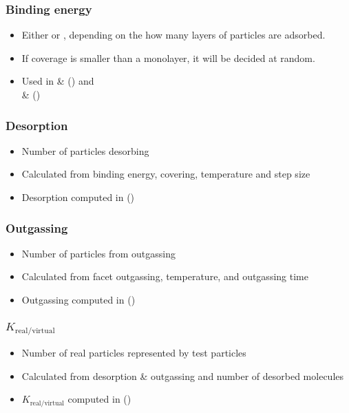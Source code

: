 \subsubsection{Binding energy}
\begin{itemize}[noitemsep,topsep=0pt, partopsep=0pt]
\item Either  or , depending on the how many layers of particles are adsorbed.
\item If coverage is smaller than a monolayer, it will be decided at random.
\item Used in  \&  () and\\  \&  ()
\end{itemize}

\subsubsection{Desorption}
\begin{itemize}[noitemsep,topsep=0pt, partopsep=0pt]
\item Number of particles desorbing
\item Calculated from binding energy, covering, temperature and step size
\item Desorption computed in  ()
\end{itemize}

\subsubsection{Outgassing}
\begin{itemize}[noitemsep,topsep=0pt, partopsep=0pt]
\item Number of particles from outgassing
\item Calculated from facet outgassing, temperature, and outgassing time
\item Outgassing computed in  ()
\end{itemize}

\subsubsection{$K_{\text{real}/\text{virtual}}$}
\begin{itemize}[noitemsep,topsep=0pt, partopsep=0pt]
\item Number of real particles represented by test particles
\item Calculated from desorption \& outgassing and number of desorbed molecules
\item $K_{\text{real}/\text{virtual}}$ computed in  ()
\end{itemize}

